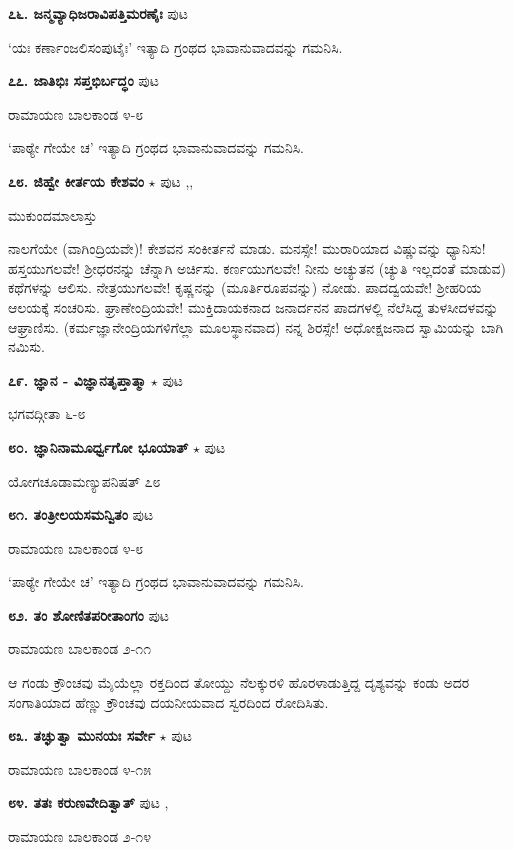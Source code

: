 \medskip
\noindent\textbf{೭೬. ಜನ್ಮವ್ಯಾಧಿಜರಾವಿಪತ್ತಿಮರಣೈಃ} \hfill ಪುಟ \pageref{173}

`ಯಃ ಕರ್ಣಾಂಜಲಿಸಂಪುಟೈಃ' ಇತ್ಯಾದಿ ಗ್ರಂಥದ ಭಾವಾನುವಾದವನ್ನು ಗಮನಿಸಿ.

\medskip
\noindent\textbf{೭೭. ಜಾತಿಭಿಃ ಸಪ್ತಭಿರ್ಬದ್ಧಂ} \hfill ಪುಟ \pageref{212}

\hfill ರಾಮಾಯಣ ಬಾಲಕಾಂಡ ೪-೮

`ಪಾಠ್ಯೇ ಗೇಯೇ ಚ' ಇತ್ಯಾದಿ ಗ್ರಂಥದ ಭಾವಾನುವಾದವನ್ನು ಗಮನಿಸಿ.

\medskip
\noindent\textbf{೭೮. ಜಿಹ್ವೇ ಕೀರ್ತಯ ಕೇಶವಂ} $\star$ \hfill ಪುಟ \pageref{214},\pageref{232},\pageref{271}

\hfill ಮುಕುಂದಮಾಲಾಸ್ತು

ನಾಲಗೆಯೇ (ವಾಗಿಂದ್ರಿಯವೇ)! ಕೇಶವನ ಸಂಕೀರ್ತನೆ ಮಾಡು. ಮನಸ್ಸೇ! ಮುರಾರಿಯಾದ ವಿಷ್ಣುವನ್ನು ಧ್ಯಾನಿಸು! ಹಸ್ತಯುಗಲವೇ! ಶ್ರೀಧರನನ್ನು ಚೆನ್ನಾಗಿ ಅರ್ಚಿಸು. ಕರ್ಣಯುಗಲವೇ! ನೀನು ಅಚ್ಯುತನ (ಚ್ಯುತಿ ಇಲ್ಲದಂತೆ ಮಾಡುವ) ಕಥೆಗಳನ್ನು ಆಲಿಸು. ನೇತ್ರಯುಗಲವೇ! ಕೃಷ್ಣನನ್ನು (ಮೂರ್ತಿರೂಪವನ್ನು) ನೋಡು. ಪಾದದ್ವಯವೇ! ಶ್ರೀಹರಿಯ ಆಲಯಕ್ಕೆ ಸಂಚರಿಸು. ಘ್ರಾಣೇಂದ್ರಿಯವೇ! ಮುಕ್ತಿದಾಯಕನಾದ ಜನಾರ್ದನನ ಪಾದಗಳಲ್ಲಿ ನೆಲೆಸಿದ್ದ ತುಳಸೀದಳವನ್ನು ಆಘ್ರಾಣಿಸು. (ಕರ್ಮಜ್ಞಾನೇಂದ್ರಿಯಗಳಿಗೆಲ್ಲಾ ಮೂಲಸ್ಥಾನವಾದ) ನನ್ನ ಶಿರಸ್ಸೇ! ಅಧೋಕ್ಷಜನಾದ ಸ್ವಾಮಿಯನ್ನು ಬಾಗಿ ನಮಿಸು.

\medskip
\noindent\textbf{೭೯. ಜ್ಞಾನ - ವಿಜ್ಞಾನತೃಪ್ತಾತ್ಮಾ} $\star$ \hfill ಪುಟ \pageref{66}

\hfill ಭಗವದ್ಗೀತಾ ೬-೮

\medskip
\noindent\textbf{೮೦. ಜ್ಞಾನಿನಾಮೂರ್ಧ್ವಗೋ ಭೂಯಾತ್} $\star$ \hfill ಪುಟ \pageref{13}

\hfill ಯೋಗಚೂಡಾಮಣ್ಯುಪನಿಷತ್ ೭೮

\medskip
\noindent\textbf{೮೧. ತಂತ್ರೀಲಯಸಮನ್ವಿತಂ} \hfill ಪುಟ \pageref{250}

\hfill ರಾಮಾಯಣ ಬಾಲಕಾಂಡ ೪-೮

`ಪಾಠ್ಯೇ ಗೇಯೇ ಚ' ಇತ್ಯಾದಿ ಗ್ರಂಥದ ಭಾವಾನುವಾದವನ್ನು ಗಮನಿಸಿ.

\medskip
\noindent\textbf{೮೨. ತಂ ಶೋಣಿತಪರೀತಾಂಗಂ} \hfill ಪುಟ \pageref{198}

\hfill ರಾಮಾಯಣ ಬಾಲಕಾಂಡ ೨-೧೧

ಆ ಗಂಡು ಕ್ರೌಂಚವು ಮೈಯೆಲ್ಲಾ ರಕ್ತದಿಂದ ತೋಯ್ದು ನೆಲಕ್ಕುರಳಿ ಹೊರಳಾಡುತ್ತಿದ್ದ ದೃಶ್ಯವನ್ನು ಕಂಡು ಅದರ ಸಂಗಾತಿಯಾದ ಹೆಣ್ಣು ಕ್ರೌಂಚವು ದಯನೀಯವಾದ ಸ್ವರದಿಂದ ರೋದಿಸಿತು.

\medskip
\noindent\textbf{೮೩. ತಚ್ಘುತ್ವಾ ಮುನಯಃ ಸರ್ವೇ} $\star$ \hfill ಪುಟ \pageref{158}

\hfill ರಾಮಾಯಣ ಬಾಲಕಾಂಡ ೪-೧೫

\medskip
\noindent\textbf{೮೪. ತತಃ ಕರುಣವೇದಿತ್ವಾತ್} \hfill ಪುಟ \pageref{199},\pageref{211}

\hfill ರಾಮಾಯಣ ಬಾಲಕಾಂಡ ೨-೧೪

